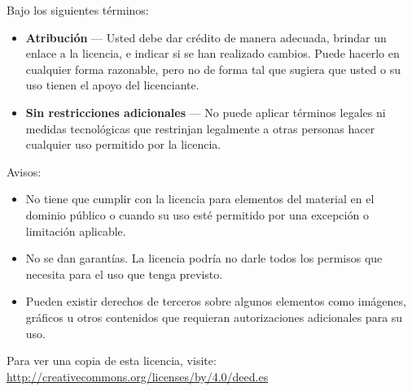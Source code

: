 \documentclass[11pt,letterpaper]{report}
\begin{document}
Bajo los siguientes términos:
\begin{itemize}
    \item \textbf{Atribución} — Usted debe dar crédito de manera adecuada, brindar un enlace a la licencia, e indicar si se han realizado cambios. Puede hacerlo en cualquier forma razonable, pero no de forma tal que sugiera que usted o su uso tienen el apoyo del licenciante.
    \item \textbf{Sin restricciones adicionales} — No puede aplicar términos legales ni medidas tecnológicas que restrinjan legalmente a otras personas hacer cualquier uso permitido por la licencia.
\end{itemize}

Avisos:
\begin{itemize}
    \item No tiene que cumplir con la licencia para elementos del material en el dominio público o cuando su uso esté permitido por una excepción o limitación aplicable.
    \item No se dan garantías. La licencia podría no darle todos los permisos que necesita para el uso que tenga previsto.
    \item Pueden existir derechos de terceros sobre algunos elementos como imágenes, gráficos u otros contenidos que requieran autorizaciones adicionales para su uso.
\end{itemize}

Para ver una copia de esta licencia, visite:\\ 
\url{http://creativecommons.org/licenses/by/4.0/deed.es}
\end{document}
